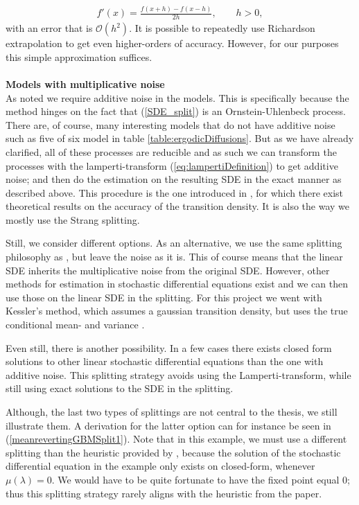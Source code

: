 \begin{align}
    f'(x) = \frac{f(x + h) - f(x - h)}{2h}, \qquad h > 0,
\end{align}
with an error that is $\mathcal{O}(h^2)$. It is possible to repeatedly use Richardson extrapolation to get even higher-orders of accuracy. However, for our purposes this simple approximation suffices.
\\\\
\textbf{Models with multiplicative noise}\\
As noted we require additive noise in the models. This is specifically because the method hinges on the fact that (\ref{SDE_split}) is an Ornstein-Uhlenbeck process. There are, of course, many interesting models that do not have additive noise such as five of six model in table \ref{table:ergodicDiffusions}. But as we have already clarified, all of these processes are reducible and as such we can transform the processes with the lamperti-transform (\ref{eq:lampertiDefinition}) to get additive noise; and then do the estimation on the resulting SDE in the exact manner as described above. This procedure is the one introduced in \cite{SplittingSchemes}, for which there exist theoretical results on the accuracy of the transition density. It is also the way we mostly use the Strang splitting.

Still, we consider different options. As an alternative, we use the same splitting philosophy as \cite{SplittingSchemes}, but leave the noise as it is. This of course means that the linear SDE inherits the multiplicative noise from the original SDE. However, other methods for estimation in stochastic differential equations exist and we can then use those on the linear SDE in the splitting. For this project we went with Kessler's method, which assumes a gaussian transition density, but uses the true conditional mean- and variance \cite[equation (1.7)]{Kessler1997}.

Even still, there is another possibility. In a few cases there exists closed form solutions to other linear stochastic differential equations than the one with additive noise. This splitting strategy avoids using the Lamperti-transform, while still using exact solutions to the SDE in the splitting. 

Although, the last two types of splittings are not central to the thesis, we still illustrate them. A derivation for the latter option can for instance be seen in (\ref{meanrevertingGBMSplit1}). Note that in this example, we must use a different splitting than the heuristic provided by \cite[section 2.3 and 2.5]{SplittingSchemes}, because the solution of the stochastic differential equation in the example only exists on closed-form, whenever $\mu(\lambda) = 0$. We would have to be quite fortunate to have the fixed point equal 0; thus this splitting strategy rarely aligns with the heuristic from the paper.
